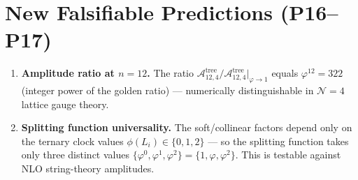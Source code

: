 \section{New Falsifiable Predictions (P16--P17)}
\label{sec:amp_predictions}

\begin{enumerate}[label=\textbf{P\arabic*.},start=16]
  \item \textbf{Amplitude ratio at $n=12$.}
        The ratio $\mathcal{A}^{\text{tree}}_{12,4}/
        \mathcal{A}^{\text{tree}}_{12,4}\big|_{\varphi\to1}$
        equals $\varphi^{12}=322$ (integer power of the golden ratio)
        --- numerically distinguishable in $\mathcal{N}=4$ lattice
        gauge theory.
  \item \textbf{Splitting function universality.}
        The soft/collinear factors depend only on the
        ternary clock values $\phi(L_i)\in\{0,1,2\}$ --- so the
        splitting function takes only three distinct values
        $\{\varphi^0,\varphi^1,\varphi^2\}=\{1,\varphi,\varphi^2\}$.
        This is testable against NLO string-theory amplitudes.
\end{enumerate}

